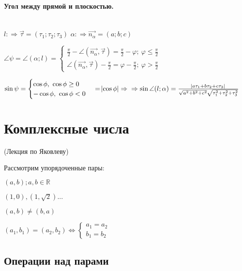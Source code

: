 \documentclass{article}
\begin{document}
    \paragraph{Угол между прямой и плоскостью.}\mbox{}\\

    \( l: \Rightarrow \overrightarrow{\tau} = (\tau_1; \tau_2; \tau_3) \)
    \( \alpha: \Rightarrow \overrightarrow{n_\alpha} = (a; b; c) \)


    \( \angle\psi = \angle(\alpha; l) = \begin{cases}
        \frac{\pi}{2} - \angle(\overrightarrow{n_\alpha}, \overrightarrow{\tau}) = \frac{\pi}{2} - \varphi;\ \varphi \leq \frac{\pi}{2}\\
        \angle(\overrightarrow{n_\alpha}, \overrightarrow{\tau}) - \frac{\pi}{2} = \varphi - \frac{\pi}{2};\ \varphi > \frac{\pi}{2}
    \end{cases}\)

    \( \sin \psi = \begin{cases}
        \cos \phi,\ \cos \phi \geq 0\\
        -\cos \phi,\ \cos \phi < 0
    \end{cases} = \abs{\cos \phi} \Rightarrow\\ \Rightarrow \sin\angle(l; \alpha) = \frac{\abs{a\tau_1 + b\tau_2 + c\tau_3}}{\sqrt{a^2 + b^2 + c^2}\sqrt{\tau_1^2 + \tau_2^2 + \tau_3^2}} \)

    \section{Комплексные числа} 

    (Лекция по Яковлеву)

    Рассмотрим упорядоченные пары:

    \( (a, b); a, b \in \mathbb{R}  \)

    \( (1, 0), (1, \sqrt{2}) ... \)

    \( (a, b) \neq (b, a) \)

    \( (a_1, b_1) = (a_2, b_2) \Leftrightarrow \begin{cases}
        a_1 = a_2\\
        b_1 = b_2
    \end{cases} \)

    \subsection{Операции над парами}
    
\end{document}
